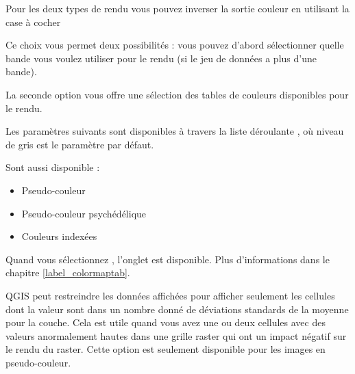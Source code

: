 Pour les deux types de rendu vous pouvez inverser la sortie couleur en
utilisant la case \`a cocher 


Ce choix vous permet deux possibilit\'es : vous pouvez d'abord s\'electionner
quelle bande vous voulez utiliser pour le rendu (si le jeu de donn\'ees a plus
d'une bande).

La seconde option vous offre une s\'election des tables de couleurs disponibles
pour le rendu.

Les param\`etres suivants sont disponibles \`a travers la liste d\'eroulante
, o\`u niveau de gris est le 
param\`etre par d\'efaut.

Sont aussi disponible :
\begin{itemize}
\item Pseudo-couleur
\item Pseudo-couleur psych\'ed\'elique
\item Couleurs index\'ees
\end{itemize}

Quand vous s\'electionnez , l'onglet
 est disponible. Plus d'informations dans le chapitre
\ref{label_colormaptab}.

QGIS peut restreindre les donn\'ees affich\'ees pour afficher seulement les
cellules dont la valeur sont dans un nombre donn\'e de d\'eviations standards de
la moyenne pour la couche. Cela est
utile quand vous avez une ou deux cellules avec des valeurs anormalement hautes
dans une grille raster qui ont un impact n\'egatif sur le rendu du raster. Cette
option est seulement disponible pour les images en pseudo-couleur.

